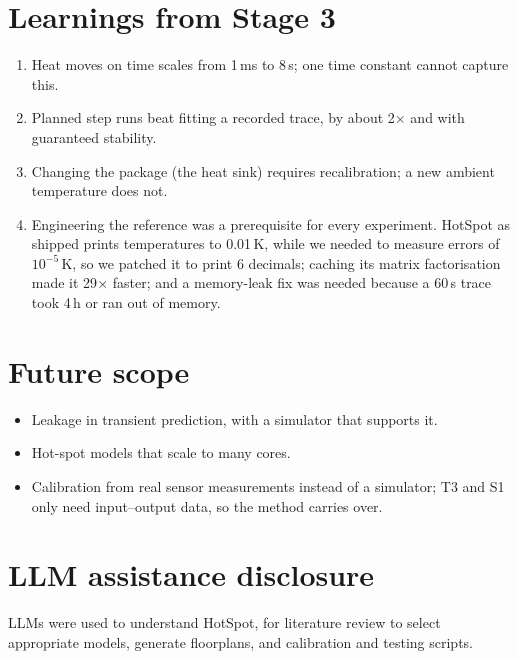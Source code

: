 \documentclass[11pt,a4paper]{article}
\begin{document}
\section{Learnings from Stage 3}
\begin{enumerate}
  \item Heat moves on time scales from 1\,ms to 8\,s; one time constant cannot capture this.
  \item Planned step runs beat fitting a recorded trace, by about 2$\times$ and with guaranteed
        stability.
  \item Changing the package (the heat sink) requires recalibration; a new ambient temperature
        does not.
  \item Engineering the reference was a prerequisite for every experiment. HotSpot as shipped
        prints temperatures to 0.01\,K, while we needed to measure errors of $10^{-5}$\,K, so we
        patched it to print 6 decimals; caching its matrix factorisation made it 29$\times$
        faster; and a memory-leak fix was needed because a 60\,s trace took 4\,h or ran out of
        memory.
\end{enumerate}

\section{Future scope}
\begin{itemize}
  \item Leakage in transient prediction, with a simulator that supports it.
  \item Hot-spot models that scale to many cores.
  \item Calibration from real sensor measurements instead of a simulator; T3 and S1 only need
        input--output data, so the method carries over.
\end{itemize}

\section{LLM assistance disclosure}
LLMs were used to understand HotSpot, for literature review to select appropriate models, generate
floorplans, and calibration and testing scripts.
\end{document}
